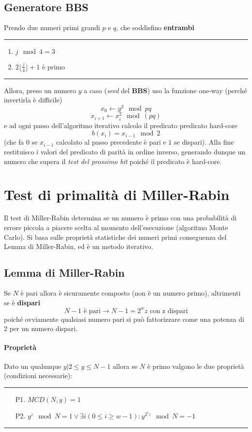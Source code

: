 \documentclass{article}
\begin{document}
\subsection{Generatore BBS}
Prendo due numeri primi grandi $p$ e $q$, che soddisfino \textbf{entrambi}
\hrule
\begin{enumerate}
    \item $j\mod 4 = 3$
    \item $ 2\lfloor{\frac{j}{4}}\rfloor+1$ è primo 
\end{enumerate}
\hrule

Allora, preso un numero $y$ a caso (\textit{seed} del \textbf{BBS}) uso la funzione one-way (perché invertirla è difficile)
\[
x_0\leftarrow y^2 \mod pq
\]\[
x_{i+1}\leftarrow x_i^2 \mod (pq)
\]
e ad ogni passo dell'algoritmo iterativo calcolo il predicato predicato hard-core
\[
b(x_i)=x_{i-1}\mod 2
\]
(che fa $0$ se $x_{i-1}$ calcolato al passo precedente è pari e $1$ se dispari).
Alla fine restituisco i valori del predicato di parità in ordine inverso, generando dunque un numero che supera il \textit{test del prossimo bit} poiché il predicato è hard-core.

\section{Test di primalità di Miller-Rabin}
Il test di Miller-Rabin determina se un numero è primo con una probabilità di errore piccola a piacere scelta al momento dell'esecuzione (algoritmo Monte Carlo). Si basa sulle proprietà statistiche dei numeri primi conseguenza del Lemma di Miller-Rabin, ed è un metodo iterativo.
\subsection{Lemma di Miller-Rabin}
Se $N$ è pari allora è sicuramente composto (non è un numero primo), altrimenti se è \textbf{dispari}
\[
N-1\text{ è pari}\to N-1=2^w z\text{ con z dispari}
\]
poiché ovviamente qualsiasi numero pari si può fattorizzare come una potenza di $2$ per un numero dispari.
\paragraph{Proprietà} Dato un qualunque $y|2\le y\le N-1$ allora se $N$ è primo valgono le due proprietà (condizioni necessarie):
\hrule
\begin{enumerate}
    \item[P1.] $MCD(N,y)=1$ 
    \item[P2.] $y^z\mod N=1 \lor \exists i(0\le i\ge w-1):y^{2^i z}\mod N =-1$
\end{enumerate}{}
\hrule
\end{document}
